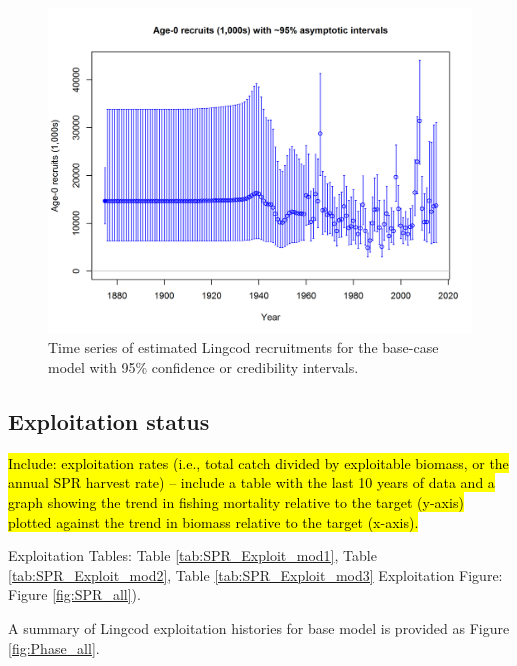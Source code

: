 \documentclass[12pt,]{article}
\begin{document}
\begin{figure}[htbp]
\centering
\includegraphics{r4ss/plots_mod1/ts11_Age-0_recruits_(1000s)_with_95_asymptotic_intervals.png}
\caption{Time series of estimated Lingcod recruitments for the base-case
model with 95\% confidence or credibility intervals.
\label{fig:Recruits_all}}
\end{figure}

\FloatBarrier

\subsection*{Exploitation status}\label{exploitation-status}

\hl{Include: exploitation rates (i.e., total catch divided by exploitable biomass, or the annual SPR harvest rate) – include a table with the last 10 years of data and a graph showing the trend in fishing mortality relative to the target (y-axis) plotted against the trend in biomass relative to the target (x-axis).}

Exploitation Tables: Table \ref{tab:SPR_Exploit_mod1}, Table
\ref{tab:SPR_Exploit_mod2}, Table \ref{tab:SPR_Exploit_mod3}
Exploitation Figure: Figure \ref{fig:SPR_all}).

A summary of Lingcod exploitation histories for base model is provided
as Figure \ref{fig:Phase_all}.

\FloatBarrier
\end{document}
